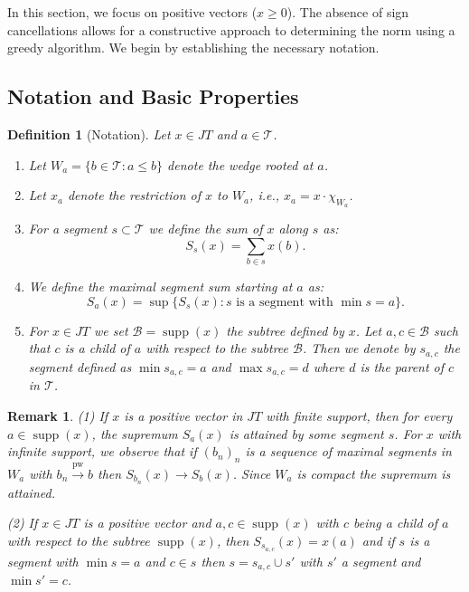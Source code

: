 \documentclass[11pt,a4paper]{amsart}
\newtheorem{definition}[theorem]{Definition}
\newtheorem{remark}[theorem]{Remark}
\newcommand{\JT}{JT}
\newcommand{\Tree}{\mathcal{T}}
\newcommand{\supp}{\operatorname{supp}}
\begin{document}
In this section, we focus on positive vectors ($x \ge 0$). The absence of sign cancellations allows for a constructive approach to determining the norm using a greedy algorithm. We begin by establishing the necessary notation.

\subsection{Notation and Basic Properties}

\begin{definition}[Notation]\label{No1}
    Let $x \in \JT$ and $a \in \Tree$.
    \begin{enumerate}
        \item Let $W_a = \{ b \in \Tree : a \le b \}$ denote the wedge rooted at $a$.
        \item Let $x_a$ denote the restriction of $x$ to $W_a$, i.e., $x_a = x \cdot \chi_{W_a}$.
        \item For a segment $s \subset \Tree$ we define the sum of $x$ along $s$ as:
        \[ S_s(x) = \sum_{b \in s} x(b). \]
        \item We define the maximal segment sum starting at $a$ as:
        \[ S_a(x) = \sup \{ S_s(x) : s \text{ is a segment with } \min s = a \}. \]
        \item For $x\in \JT$ we set $\mathcal{B} = \supp(x)$ the subtree defined by $x$. Let $a,c \in \mathcal{B}$ such that $c$ is a child of $a$ with respect to the subtree $\mathcal{B}$. Then we denote by $s_{a, c}$ the segment defined as 
        $\min s_{a, c} = a$ and $\max s_{a, c} = d$ where $d$ is the parent of $c$ in $\Tree$.
    \end{enumerate}
\end{definition}

\begin{remark}
  (1)   If $x$ is a positive vector in $\JT$ with finite support, then for every $a \in \supp(x)$, the supremum $S_a(x)$ is attained by some segment $s$.  For $x$ with infinite support, we observe that  if $(b_n)_n $  is a sequence of maximal segments in $W_a$
  with $  b_n  \xrightarrow{\text{pw}} b$ then $S_{b_n} (x) \to S_b(x) $.  Since  $W_a$  is compact the supremum is attained.
  
  (2)  If $x\in \JT$ is a positive vector and $a, c \in \supp(x) $ with $c$ being a child of $a$ with respect to the subtree $\supp(x)$, 
  then $S_{s_{a,c}}(x) = x(a)$ and if $s$ is a segment with $\min s= a$ and $c\in s$ then $s = s_{a,c} \cup s' $ with  $s'$ a segment and $\min s' = c$.  
\end{remark}
  
\end{document}
